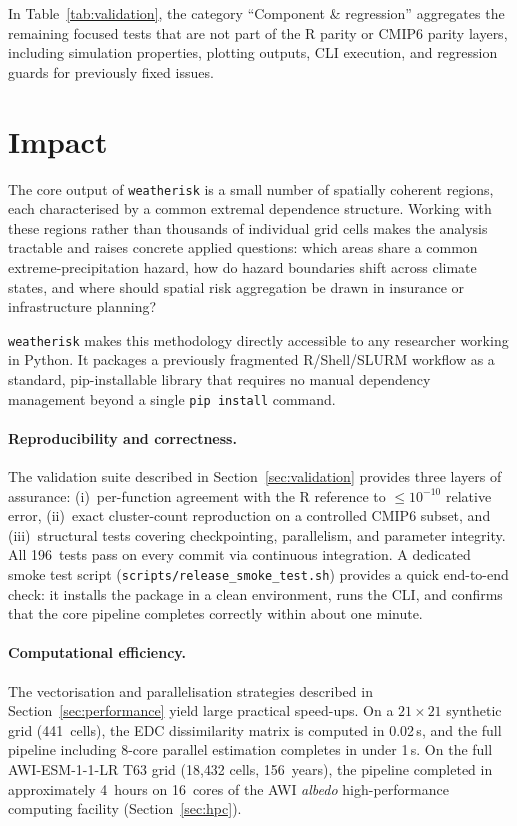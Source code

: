 \documentclass[preprint,12pt,a4paper]{elsarticle}
\newcommand{\rev}[1]{{#1}}
\newcommand{\revg}[1]{{\color{RevisionGreen}#1}}
\newcommand{\revo}[1]{{\color{RevisionOrange}#1}}
\begin{document}
In Table~\ref{tab:validation}, the category ``Component \&
regression'' aggregates the remaining focused tests that are not part
of the R parity or CMIP6 parity layers, including simulation
properties, plotting outputs, CLI execution, and regression guards for
previously fixed issues.

\FloatBarrier

\section{Impact}
\label{sec:impact}

\revg{The core output of \texttt{weatherisk} is a small number of
spatially coherent regions, each characterised by a common extremal
dependence structure. Working with these regions rather than
thousands of individual grid cells makes the analysis tractable and
raises concrete applied questions: which areas share a common
extreme-precipitation hazard, how do hazard boundaries shift across
climate states, and where should spatial risk aggregation be drawn
in insurance or infrastructure planning?}

\revo{\texttt{weatherisk} makes this methodology directly accessible
to any researcher working in Python. It packages a previously
fragmented R/Shell/SLURM workflow as a standard, pip-installable
library that requires no manual dependency management beyond a single
\texttt{pip install} command.}

\rev{\paragraph{Reproducibility and correctness.}
The validation suite described in Section~\ref{sec:validation}
provides three layers of assurance: (i)~per-function agreement
with the R reference to $\leq 10^{-10}$ relative error, (ii)~exact
cluster-count reproduction on a controlled CMIP6 subset, and
(iii)~structural tests covering checkpointing, parallelism, and
parameter integrity. All 196~tests pass on every commit via
continuous integration.
A dedicated smoke test script (\texttt{scripts/release\_smoke\_test.sh})
provides a quick end-to-end check: it installs the package in a clean
environment, runs the CLI, and confirms that the core pipeline completes
correctly within about one minute.}

\paragraph{Computational efficiency.}
The vectorisation and parallelisation strategies described in
Section~\ref{sec:performance} yield large practical speed-ups.
On a $21 \times 21$ synthetic grid (441~cells), the EDC
dissimilarity matrix is computed in 0.02\,s, and the full pipeline
including 8-core parallel estimation completes in under 1\,s.
\rev{On the full AWI-ESM-1-1-LR T63 grid (18{,}432 cells,
156~years), the pipeline completed in approximately 4~hours
on 16~cores of the AWI \emph{albedo} high-performance computing
facility (Section~\ref{sec:hpc}).}
\end{document}
